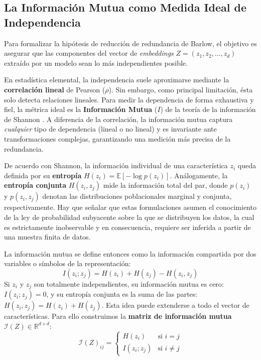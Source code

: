 \subsection{La Información Mutua como Medida Ideal de Independencia}

Para formalizar la hipótesis de reducción de redundancia de Barlow, el objetivo es asegurar que las componentes del vector de \textit{embeddings} $Z = (z_1, z_2, \dots, z_d)$ extraído por un modelo sean lo más independientes posible.

En estadística elemental, la independencia suele aproximarse mediante la \textbf{correlación lineal} de Pearson ($\rho$). Sin embargo, como principal limitación, ésta solo detecta relaciones lineales. Para medir la dependencia de forma exhaustiva y fiel, la métrica ideal es la \textbf{Información Mutua} ($I$) de la teoría de la información de Shannon \cite{shannon1948mathematical}. A diferencia de la correlación, la información mutua captura \textit{cualquier} tipo de dependencia (lineal o no lineal) y es invariante ante transformaciones complejas, garantizando una medición más precisa de la redundancia.

De acuerdo con Shannon, la información individual de una característica $z_i$ queda definida por su \textbf{entropía} $H(z_i) = \mathbb{E}[-\log p(z_i)]$. Análogamente, la \textbf{entropía conjunta} $H(z_i, z_j)$ mide la información total del par, donde $p(z_i)$ y $p(z_i,z_j)$ denotan las distribuciones poblacionales marginal y conjunta, respectivamente. Hay que señalar que estas formulaciones asumen el conocimiento de la ley de probabilidad subyacente sobre la que se distribuyen los datos, la cual es estrictamente inobservable y en consecuencia, requiere ser inferida a partir de una muestra finita de datos.

La información mutua se define entonces como la información compartida por dos variables o símbolos de la representación:
\begin{equation}
I(z_i; z_j) = H(z_i) + H(z_j) - H(z_i, z_j)
\end{equation}
Si $z_i$ y $z_j$ son totalmente independientes, su información mutua es cero: $I(z_i; z_j) = 0$, y su entropía conjunta es la suma de las partes: $H(z_i, z_j) = H(z_i) + H(z_j)$. Esta idea puede extenderse a todo el vector de características. Para ello construimos la \textbf{matriz de información mutua} $\mathcal{I}(Z) \in \mathbb{R}^{d \times d}$:
\begin{equation}
\mathcal{I}(Z)_{ij} = 
\begin{cases}
H(z_i) & \text{si } i = j \\
I(z_i; z_j) & \text{si } i \neq j
\end{cases}
\end{equation}

